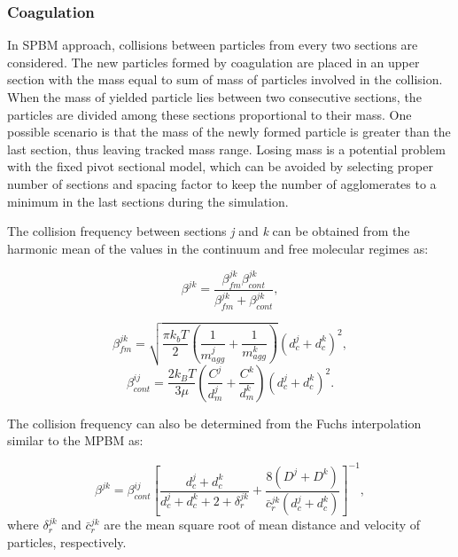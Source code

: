 \subsubsection{Coagulation}
\label{sec:sectcoag}
In SPBM approach, collisions between particles from every two sections are considered. The new particles formed by coagulation are placed in an upper section with the mass equal to sum of mass of particles involved in the collision. When the mass of yielded particle lies between two consecutive sections, the particles are divided among these sections proportional to their mass. One possible scenario is that the mass of the newly formed particle is greater than the last section, thus leaving tracked mass range. Losing mass is a potential problem with the fixed pivot sectional model, which can be avoided by selecting proper number of sections and spacing factor to keep the number of agglomerates to a minimum in the last sections during the simulation.

The collision frequency between sections \textit{j} and \textit{k} can be obtained from the harmonic mean of the values in the continuum and free molecular regimes as:

\begin{equation}
	\beta^{jk} = 				       \frac{\beta^{jk}_{fm}\beta^{jk}_{cont}}{\beta^{jk}_{fm}
		+\beta^{jk}_{cont}}
	\label{eqn:betahmsect},
\end{equation}

\begin{equation}
	\beta^{jk}_{fm} =
	\sqrt{
		\frac{\pi k_b T}{2}
		\left(
			\frac{1}{m^j_{agg}}+
			\frac{1}{m^k_{agg}}
		\right)
	} 
	\left(
		d^j_c+d^k_c
	\right)^2
	\label{eqn:betafmsect},
\end{equation}
\begin{equation}
	\beta^{ij}_{cont} = \frac{2k_BT}{3\mu}
	\left(
		\frac{C^j}{d^j_m}+
		\frac{C^k}{d^k_m}
	\right)
	\left(
		d^j_c+d^k_c
	\right)^2
	\label{eqn:betacontsect}.
\end{equation}

The collision frequency can also be determined from the Fuchs interpolation similar to the MPBM as:

\begin{equation}
	\beta^{jk}=
	\beta^{ij}_{cont}
	\left[
		\frac{d^j_c+d^k_c}{d^j_c+d^k_c+2+\delta^{jk}_r}+
		\frac{8\left(D^j+D^k\right)}
		{\bar{c}^{jk}_r\left(d^j_c+d^k_c\right)}
	\right]^{-1}
	\label{eqn:betafuchssect},
\end{equation}
\noindent where ${\delta^{jk}_r}$ and ${\bar{c}^{jk}_r}$ are the mean square root of mean distance and velocity of particles, respectively.

